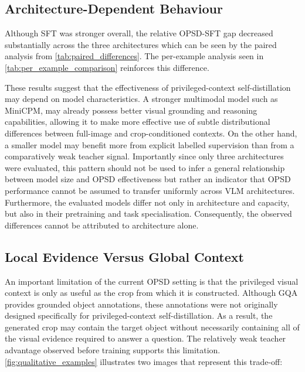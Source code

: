 \subsection{Architecture-Dependent Behaviour}

Although SFT was stronger overall, the relative OPSD-SFT gap decreased substantially across the
three architectures which can be seen by the paired analysis from \autoref{tab:paired_differences}.
The per-example analysis seen in \autoref{tab:per_example_comparison} reinforces this difference.

These results suggest that the effectiveness of privileged-context self-distillation may depend
on model characteristics. A stronger multimodal model such as MiniCPM, may already possess
better visual grounding and reasoning capabilities, allowing it to make more effective use of
subtle distributional differences between full-image and crop-conditioned contexts. On the other hand,
a smaller model may benefit more from explicit labelled supervision than from a comparatively weak
teacher signal. Importantly since only three architectures were evaluated, this pattern should not be used
to infer a general relationship between model size and OPSD effectiveness but rather an indicator
that OPSD performance cannot be assumed to transfer uniformly across VLM architectures. Furthermore,
the evaluated models differ not only in architecture and capacity, but also in their pretraining and
task specialisation. Consequently, the observed differences cannot be attributed to architecture alone.

\subsection{Local Evidence Versus Global Context}

An important limitation of the current OPSD setting is that the privileged visual context
is only as useful as the crop from which it is constructed. Although GQA provides grounded
object annotations, these annotations were not originally designed specifically for privileged-context 
self-distillation. As a result, the generated crop may contain the target object without necessarily
containing all of the visual evidence required to answer a question. The relatively weak teacher
advantage observed before training supports this limitation. \autoref{fig:qualitative_examples} illustrates
two images that represent this trade-off:

